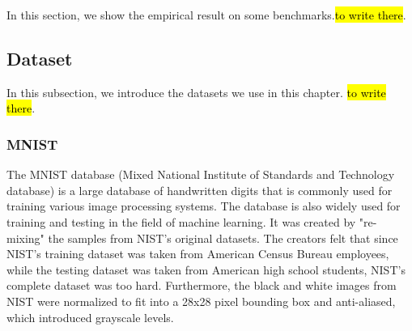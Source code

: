 In this section, we show the empirical result on some benchmarks.\hl{to write there}.

\subsection{Dataset}
In this subsection, we introduce the datasets we use in this chapter.
\hl{to write there}.

\subsubsection{MNIST}
The MNIST database \cite{lecun1998gradient} (Mixed National Institute of Standards and Technology database) is a large database of handwritten digits that is commonly used for training various image processing systems. The database is also widely used for training and testing in the field of machine learning. It was created by "re-mixing" the samples from NIST's original datasets. The creators felt that since NIST's training dataset was taken from American Census Bureau employees, while the testing dataset was taken from American high school students, NIST's complete dataset was too hard. Furthermore, the black and white images from NIST were normalized to fit into a 28x28 pixel bounding box and anti-aliased, which introduced grayscale levels.

